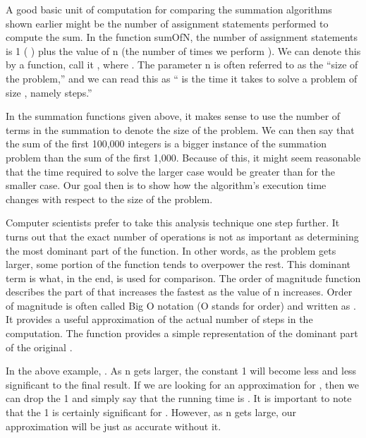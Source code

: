 A good basic unit of computation for comparing the summation algorithms shown earlier might be the number of assignment statements performed to compute the sum. In the function sumOfN, the number of assignment statements is 1 (
) plus the value of n (the number of times we perform ). We can denote this by a function, call it , where . The parameter n is often referred to as the “size of the problem,” and we can read this as “ is the time it takes to solve a problem of size , namely
steps.”

In the summation functions given above, it makes sense to use the number of terms in the summation to denote the size of the problem. We can then say that the sum of the first 100,000 integers is a bigger instance of the summation problem than the sum of the first 1,000. Because of this, it might seem reasonable that the time required to solve the larger case would be greater than for the smaller case. Our goal then is to show how the algorithm’s execution time changes with respect to the size of the problem.

Computer scientists prefer to take this analysis technique one step further. It turns out that the exact number of operations is not as important as determining the most dominant part of the
function. In other words, as the problem gets larger, some portion of the function tends to overpower the rest. This dominant term is what, in the end, is used for comparison. The order of magnitude function describes the part of that increases the fastest as the value of n increases. Order of magnitude is often called Big O notation (O stands for order) and written as . It provides a useful approximation of the actual number of steps in the computation. The function provides a simple representation of the dominant part of the original .

In the above example, . As n gets larger, the constant 1 will become less and less significant to the final result. If we are looking for an approximation for , then we can drop the 1 and simply say that the running time is . It is important to note that the 1 is certainly significant for .
However, as n gets large, our approximation will be just as accurate without it.

